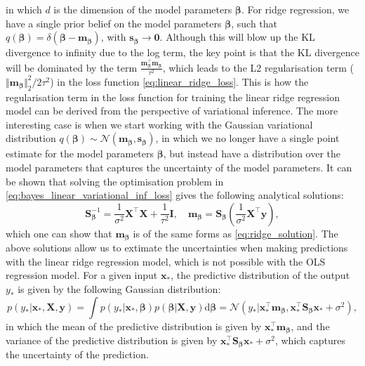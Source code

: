 in which $d$ is the dimension of the model parameters $\boldsymbol{\beta}$. For ridge regression, we have a single prior belief on the model parameters $\boldsymbol{\beta}$, such that $q(\boldsymbol{\beta})=\delta(\boldsymbol{\beta}-\bm{m}_{\boldsymbol{\beta}})$, with $\bm{s}_{\boldsymbol{\beta}}\to\bm{0}$. Although this will blow up the KL divergence to infinity due to the log term, the key point is that the KL divergence will be dominated by the term $\frac{\bm{m}_{\boldsymbol{\beta}}^\top \bm{m}_{\boldsymbol{\beta}}}{\tau^2}$, which leads to the L2 regularisation term ($\Vert\bm{m}_{\boldsymbol{\beta}}\Vert_2^2/2\tau^2$) in the loss function \cref{eq:linear_ridge_loss}. This is how the regularisation term in the loss function for training the linear ridge regression model can be derived from the perspective of variational inference. The more interesting case is when we start working with the Gaussian variational distribution $q(\boldsymbol{\beta})\sim\mathcal{N}(\bm{m}_{\boldsymbol{\beta}},\bm{s}_{\boldsymbol{\beta}})$, in which we no longer have a single point estimate for the model parameters $\boldsymbol{\beta}$, but instead have a distribution over the model parameters that captures the uncertainty of the model parameters. It can be shown that solving the optimisation problem in \cref{eq:bayes_linear_variational_inf_loss} gives the following analytical solutions:
\begin{equation}
    \label{eq:bayes_linear_variational_best_solutions}
\bm{S}_{\boldsymbol{\beta}}^{-1} = \frac{1}{\sigma^2}\bm{X}^\top\bm{X} + \frac{1}{\tau^2}\bm{I},\quad \bm{m}_{\boldsymbol{\beta}} = \bm{S}_{\boldsymbol{\beta}}\left(\frac{1}{\sigma^2}\bm{X}^\top\bm{y}\right),
\end{equation}
which one can show that  $\bm{m}_{\boldsymbol{\beta}}$ is of the same forms as  \cref{eq:ridge_solution}. The above solutions allow us to extimate the uncertainties when making predictions with the linear ridge regression model, which is not possible with the OLS regression model. For a given input $\bm{x}_{*}$, the predictive distribution of the output $y_*$ is given by the following Gaussian distribution:
\begin{equation}    \label{eq:bayes_linear_variational_inf_predictive_dist}
p(y_*|\bm{x}_*,\bm{X},\bm{y}) = \int p(y_*|\bm{x}_*,\boldsymbol{\beta})p(\boldsymbol{\beta}|\bm{X},\bm{y}) \mathrm{d}\boldsymbol{\beta} = \mathcal{N}(y_*|\bm{x}_*^\top\bm{m}_{\boldsymbol{\beta}},\bm{x}_*^\top\bm{S}_{\boldsymbol{\beta}}\bm{x}_*+\sigma^2),
\end{equation}
in which the mean of the predictive distribution is given by $\bm{x}_*^\top\bm{m}_{\boldsymbol{\beta}}$, and the variance of the predictive distribution is given by $\bm{x}_*^\top\bm{S}_{\boldsymbol{\beta}}\bm{x}_*+\sigma^2$, which captures the uncertainty of the prediction.

